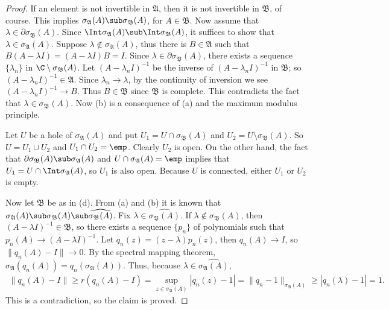 \begin{proof}
If an element is not invertible in $\mathfrak{A}$, then it is not invertible in $\mathfrak{B}$, of course. This implies $\sigma_{\mathfrak{A}}(A)\sub\sigma_{\mathfrak{B}}(A)$, for $A\in\mathfrak{B}$. Now assume that $\lambda\in\partial\sigma_{\mathfrak{B}}(A)$. Since $\Int\sigma_{\mathfrak{A}}(A)\sub\Int\sigma_{\mathfrak{B}}(A)$, it suffices to show that $\lambda\in\sigma_{\mathfrak{A}}(A)$. Suppose $\lambda\notin\sigma_{\mathfrak{A}}(A)$, thus there is $B\in\mathfrak{A}$ such that $B(A-\lambda I)=(A-\lambda I)B=I$. Since $\lambda\in\partial\sigma_{\mathfrak{B}}(A)$, there exists a sequence $\{\lambda_n\}$ in $\C\setminus\sigma_{\mathfrak{B}}(A)$. Let $(A-\lambda_nI)^{-1}$ be the inverse of $(A-\lambda_nI)^{-1}$ in $\mathfrak{B}$; so $(A-\lambda_nI)^{-1}\in\mathfrak{A}$. Since $\lambda_n\to\lambda$, by the continuity of inversion we see $(A-\lambda_nI)^{-1}\to B$. Thus $B\in\mathfrak{B}$ since $\mathfrak{B}$ is complete. This contradicts the fact that $\lambda\in\sigma_{\mathfrak{B}}(A)$. Now (b) is a consequence of (a) and the maximum modulus principle.\par
Let $U$ be a hole of $\sigma_{\mathfrak{A}}(A)$ and put $U_1=U\cap\sigma_{\mathfrak{B}}(A)$ and $U_2=U\setminus\sigma_{\mathfrak{B}}(A)$. So $U=U_1\cup U_2$ and $U_1\cap U_2=\emp$. Clearly $U_2$ is open. On the other hand, the fact that $\partial\sigma_{\mathfrak{B}}(A)\sub\sigma_{\mathfrak{A}}(A)$ and $U\cap\sigma_{\mathfrak{A}}(A)=\emp$ implies that $U_1=U\cap\Int\sigma_{\mathfrak{A}}(A)$, so $U_1$ is also open. Because $U$ is connected, either $U_1$ or $U_2$ is empty.\par
Now let $\mathfrak{B}$ be as in (d). From (a) and (b) it is known that $\sigma_{\mathfrak{A}}(A)\sub\sigma_{\mathfrak{B}}(A)\sub\widehat{\sigma_{\mathfrak{B}}(A)}$. Fix $\lambda\in\widehat{\sigma_{\mathfrak{B}}(A)}$. If $\lambda\notin\sigma_{\mathfrak{B}}(A)$, then $(A-\lambda I)^{-1}\in\mathfrak{B}$, so there exists a sequence $\{p_n\}$ of polynomials such that $p_n(A)\to(A-\lambda I)^{-1}$. Let $q_n(z)=(z-\lambda)p_n(z)$, then $q_n(A)\to I$, so $\|q_n(A)-I\|\to 0$. By the spectral mapping theorem, $\sigma_{\mathfrak{A}}(q_n(A))=q_n(\sigma_{\mathfrak{A}}(A))$. Thus, because $\lambda\in\widehat{\sigma_{\mathfrak{A}}(A)}$,
\begin{align*}
\|q_n(A)-I\|\geq r(q_n(A)-I)=\sup_{z\in\sigma_{\mathfrak{A}}(A)}|q_n(z)-1|=\|q_n-1\|_{\sigma_{\mathfrak{A}}(A)}\geq|q_n(\lambda)-1|=1.
\end{align*}
This is a contradiction, so the claim is proved.
\end{proof}
